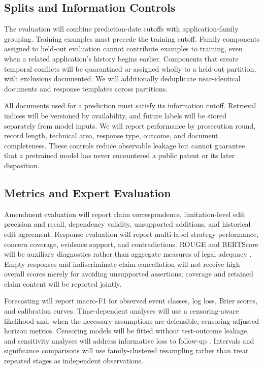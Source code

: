 \documentclass[11pt]{article}
\begin{document}
\subsection{Splits and Information Controls}
\label{sec:exp-splits}

The evaluation will combine prediction-date cutoffs with application-family grouping. Training examples must precede the training cutoff. Family components assigned to held-out evaluation cannot contribute examples to training, even when a related application's history begins earlier. Components that create temporal conflicts will be quarantined or assigned wholly to a held-out partition, with exclusions documented. We will additionally deduplicate near-identical documents and response templates across partitions.

All documents used for a prediction must satisfy its information cutoff. Retrieval indices will be versioned by availability, and future labels will be stored separately from model inputs. We will report performance by prosecution round, record length, technical area, response type, outcome, and document completeness. These controls reduce observable leakage but cannot guarantee that a pretrained model has never encountered a public patent or its later disposition.

\subsection{Metrics and Expert Evaluation}
\label{sec:exp-metrics}

Amendment evaluation will report claim correspondence, limitation-level edit precision and recall, dependency validity, unsupported additions, and historical edit agreement. Response evaluation will report multi-label strategy performance, concern coverage, evidence support, and contradictions. ROUGE and BERTScore will be auxiliary diagnostics rather than aggregate measures of legal adequacy \citep{lin2004rouge,zhang2019bertscore}. Empty responses and indiscriminate claim cancellation will not receive high overall scores merely for avoiding unsupported assertions; coverage and retained claim content will be reported jointly.

Forecasting will report macro-F1 for observed event classes, log loss, Brier scores, and calibration curves. Time-dependent analyses will use a censoring-aware likelihood and, when the necessary assumptions are defensible, censoring-adjusted horizon metrics. Censoring models will be fitted without test-outcome leakage, and sensitivity analyses will address informative loss to follow-up \citep{lee2018deephit}. Intervals and significance comparisons will use family-clustered resampling rather than treat repeated stages as independent observations.
\end{document}
